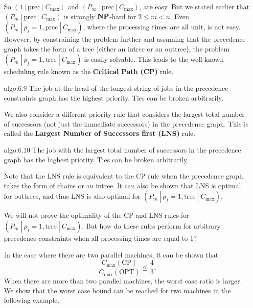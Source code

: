 So $(1~|~\text{prec}~|~C_{\max})$ and $(P_\infty~|~\text{prec}~|~C_{\max})$,
are easy. But we stated earlier that $(P_m~|~\text{prec}~|~C_{\max})$ is 
strongly $\operatorname{\textbf{NP}}$-hard for $2 \leq m < n$. Even $(P_m~|~p_j = 1, \text{prec}~|~C_{\max})$,
where the processing times are all unit, is not easy. However, by constraining 
the problem further and assuming that the precedence graph takes the form 
of a tree (either an intree or an outtree), the problem $(P_m~|~p_j = 1, 
\text{tree}~|~C_{\max})$ is easily solvable. This leads to the well-known 
scheduling rule known as the {\bf Critical Path (CP)} rule. 

\begin{algo}{algo:6.9}
    The job at the head of the longest string of jobs in the precedence
    constraints graph has the highest priority. Ties can be broken arbitrarily.
\end{algo}

We also consider a different priority rule that considers the largest 
total number of successors (not just the immediate successors) in the 
precedence graph. This is called the {\bf Largest Number of Successors first 
(LNS)} rule. 

\begin{algo}{algo:6.10}
    The job with the largest total number of successors in the 
    precedence graph has the highest priority. Ties can be broken arbitrarily.
\end{algo}

Note that the LNS rule is equivalent to the CP rule when the precedence 
graph takes the form of chains or an intree. It can also be shown that 
LNS is optimal for outtrees, and thus LNS is also optimal for 
$(P_m~|~p_j = 1, \text{tree}~|~C_{\max})$.

We will not prove the optimality of the CP and LNS rules for 
$(P_m~|~p_j = 1, \text{tree}~|~C_{\max})$. But how do these rules perform for 
arbitrary precedence constraints when all processing times are equal to $1$? 

In the case where there are two parallel machines, it can be shown that 
\[ \frac{C_{\max}(\text{CP})}{C_{\max}(\text{OPT})} \leq \frac43. \] 
When there are more than two parallel machines, the worst case ratio is larger. 
We show that the worst case bound can be reached for two machines in the 
following example. 

